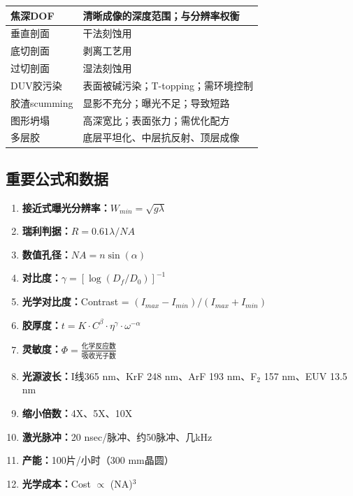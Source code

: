\documentclass[UTF8,12pt,a4paper]{ctexart}
\begin{document}
\begin{longtable}{|L{4.5cm}|L{10.5cm}|}
焦深DOF & 清晰成像的深度范围；与分辨率权衡 \\
\hline

垂直剖面 & 干法刻蚀用 \\
\hline

底切剖面 & 剥离工艺用 \\
\hline

过切剖面 & 湿法刻蚀用 \\
\hline

DUV胶污染 & 表面被碱污染；T-topping；需环境控制 \\
\hline

胶渣scumming & 显影不充分；曝光不足；导致短路 \\
\hline

图形坍塌 & 高深宽比；表面张力；需优化配方 \\
\hline

多层胶 & 底层平坦化、中层抗反射、顶层成像 \\
\hline

\end{longtable}

\subsection{重要公式和数据}

\begin{enumerate}
    \item \textbf{接近式曝光分辨率：}$W_{min} = \sqrt{g\lambda}$
    \item \textbf{瑞利判据：}$R = 0.61\lambda/NA$
    \item \textbf{数值孔径：}$NA = n\sin(\alpha)$
    \item \textbf{对比度：}$\gamma = [\log(D_f/D_0)]^{-1}$
    \item \textbf{光学对比度：}Contrast = $(I_{max}-I_{min})/(I_{max}+I_{min})$
    \item \textbf{胶厚度：}$t = K \cdot C^\beta \cdot \eta^\gamma \cdot \omega^{-\alpha}$
    \item \textbf{灵敏度：}$\Phi = \frac{\text{化学反应数}}{\text{吸收光子数}}$
    \item \textbf{光源波长：}I线365 nm、KrF 248 nm、ArF 193 nm、F$_2$ 157 nm、EUV 13.5 nm
    \item \textbf{缩小倍数：}4X、5X、10X
    \item \textbf{激光脉冲：}20 nsec/脉冲、约50脉冲、几kHz
    \item \textbf{产能：}100片/小时（300 mm晶圆）
    \item \textbf{光学成本：}Cost $\propto$ (NA)$^3$
\end{enumerate}
\end{document}
